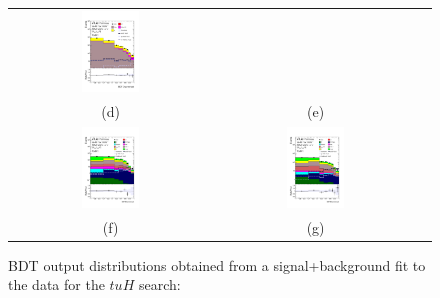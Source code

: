 \begin{figure}[H]
\begin{tabular}{@{}ccc@{}}
\includegraphics[width=0.3\textwidth]{figures/tuH_reg1l1tau1b3j_os.pdf}&\\
(d) & (e)\\
\includegraphics[width=0.3\textwidth]{figures/tuH_reg2mtau1b2jos.pdf}&
\includegraphics[width=0.3\textwidth]{figures/tuH_reg2mtau1b3jos.pdf}&\\
(f) & (g)  &  \\
\end{tabular}
\caption{ BDT output distributions obtained from a signal+background fit to the data for the $tuH$ search: 
}
\end{figure}
